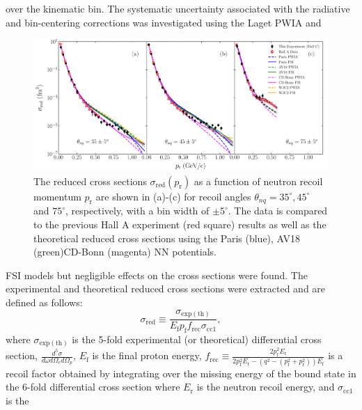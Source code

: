 over the kinematic bin. The systematic uncertainty associated with the radiative and bin-centering corrections was investigated using the Laget PWIA and 
\onecolumngrid
\begin{center}
\begin{figure}
\includegraphics[scale=0.46]{prl_plots/PRL_plot1_WJC2.pdf}
\caption{The reduced cross sections $\sigma_{\mathrm{red}}(p_{\mathrm{r}})$ as a function of neutron recoil momentum $p_{\mathrm{r}}$ are shown in (a)-(c) for recoil angles $\theta_{nq}=35^{\circ}, 45^{\circ}$ and $75^{\circ}$, respectively,
with a bin width of $\pm 5^{\circ}$. The data is compared to the previous Hall A experiment (red square) results \cite{PhysRevLett.107.262501} as well as the theoretical reduced cross sections using the Paris (blue),
AV18 (green)\DIFdelbeginFL {}\DIFdelendFL \DIFaddbeginFL \DIFaddFL{, }\DIFaddendFL CD-Bonn (magenta) \DIFaddbeginFL {}\DIFaddendFL NN potentials.}
\label{fig:fig1}
\end{figure}
\end{center}
\twocolumngrid
\noindent FSI models but negligible effects on the cross sections were found. The experimental and theoretical reduced cross sections were extracted and are defined as follows:
\begin{equation}
\sigma_{\mathrm{red}} \equiv \frac{\sigma_{\mathrm{exp(th)}}}{E_{\mathrm{f}}p_{\mathrm{f}}f_{\mathrm{rec}}\sigma_{\mathrm{cc1}}},
\label{eq:1}
\end{equation}
\noindent where $\sigma_{\mathrm{exp(th)}}$ is the 5-fold experimental (or theoretical) differential cross section, $\frac{d^{5}\sigma}{d\omega d\Omega_{e} d\Omega_{p}}$,
$E_{\mathrm{f}}$ is the final proton energy, $f_{\mathrm{rec}}\equiv \frac{2p_{\mathrm{f}}^{2}E_{\mathrm{r}}}{2p_{\mathrm{f}}^{2}E_{\mathrm{r}} - (q^{2} - (p_{\mathrm{f}}^{2} + p_{\mathrm{r}}^{2}))E_{\mathrm{f}}}$
is a recoil factor obtained by integrating over the missing energy of the bound state in the 6-fold differential cross section where $E_{\mathrm{r}}$ is the neutron recoil energy, and $\sigma_{\mathrm{cc1}}$ is the
